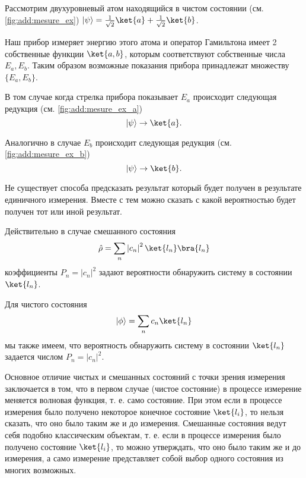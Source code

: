 \begin{example}
Рассмотрим двухуровневый атом находящийся в чистом состоянии
(см. \autoref{fig:add:mesure_ex}) 
\(
\left|\psi\right> = \frac{1}{\sqrt{2}}\ket{a}
+ \frac{1}{\sqrt{2}}\ket{b}
\).



Наш прибор измеряет энергию этого атома и  оператор
Гамильтона имеет 2 собственные функции $\ket{a,b}$, которым
соответствуют собственные числа $E_a, E_b$. Таким образом возможные
показания прибора принадлежат множеству $\{E_a, E_b\}$. 



В том случае когда стрелка прибора показывает $E_a$ происходит
следующая редукция  (см. \autoref{fig:add:mesure_ex_a})
\[
\left|\psi\right> \to \ket{a}.
\]



Аналогично в случае $E_b$ происходит
следующая редукция  (см. \autoref{fig:add:mesure_ex_b})
\[
\left|\psi\right> \to \ket{b}.
\]
\end{example}

Не существует способа предсказать результат который будет получен в
результате единичного измерения. Вместе с тем можно сказать с какой
вероятностью будет получен тот или иной результат.

Действительно в случае смешанного состояния
\begin{equation}
\hat{\rho} = 
\sum_n \left|c_n\right|^2 \ket{l_n}\bra{l_n}
\nonumber
\end{equation}
коэффициенты $P_n = \left|c_n\right|^2$
задают вероятности обнаружить систему в состоянии $\ket{l_n}$. 

Для чистого состояния
\begin{equation}
\left| \phi \right> = 
\sum_n c_n \ket{l_n}
\nonumber
\end{equation}
мы также имеем, что вероятность обнаружить систему в состоянии
$\ket{l_n}$ задается числом $P_n = \left|c_n\right|^2$. 

Основное отличие чистых и смешанных состояний с точки зрения измерения
заключается в том, что в первом случае (чистое состояние) в процессе
измерение меняется волновая функция, т. е. само состояние. При этом
если в процессе измерения было получено некоторое конечное состояние
$\ket{l_i}$, то нельзя сказать, что оно было таким же и до
измерения. Смешанные состояния 
ведут себя подобно классическим объектам,
т. е. если в процессе измерения было получено состояние
$\ket{l_i}$, то можно утверждать, что оно было таким же и до
измерения, а само измерение представляет собой выбор
одного состояния из многих возможных.

